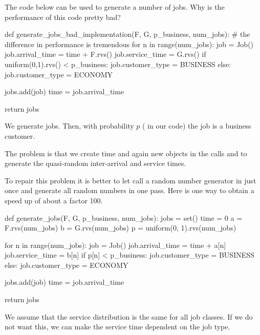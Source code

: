 \begin{exercise}
The code below can be used to generate a number of jobs. Why is the performance of this code pretty bad? 
\begin{pynotangle}
def generate_jobs_bad_implementation(F, G, p_business, num_jobs):
    # the difference in performance is tremendous
    for n in range(num_jobs):
        job = Job()
        job.arrival_time = time + F.rvs()
        job.service_time = G.rvs()
        if uniform(0,1).rvs() < p_business:
            job.customer_type = BUSINESS
        else:
            job.customer_type = ECONOMY

        jobs.add(job)
        time = job.arrival_time

    return jobs
\end{pynotangle}
We generate  jobs. Then, with probability $p$ ( in our code) the job is a business customer.
\begin{solution}
  The problem is that we create time and again new objects in the calls  and  to generate the quasi-random inter-arrival and service times.
\end{solution}
\end{exercise}


To repair this problem it is better to let  call a random number generator in  just once and generate all random numbers in one pass.
Here is one way to obtain a speed up of about a factor 100.
\begin{pynotangle}
def generate_jobs(F, G, p_business, num_jobs):
    jobs = set()
    time = 0
    a = F.rvs(num_jobs)
    b = G.rvs(num_jobs)
    p = uniform(0, 1).rvs(num_jobs)

    for n in range(num_jobs):
        job = Job()
        job.arrival_time = time + a[n]
        job.service_time = b[n]
        if p[n] <  p_business:
            job.customer_type = BUSINESS
        else:
            job.customer_type = ECONOMY

        jobs.add(job)
        time = job.arrival_time

    return jobs
\end{pynotangle}

We assume that the service distribution is the same for all job classes. If we do not want this, we can make the service time dependent on the job type.

